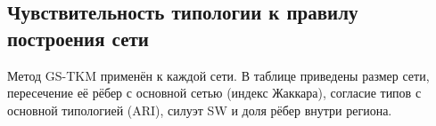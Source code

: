 \documentclass[11pt,a4paper]{article}
\begin{document}
\subsection{Чувствительность типологии к правилу построения сети}\label{ux447ux443ux432ux441ux442ux432ux438ux442ux435ux43bux44cux43dux43eux441ux442ux44c-ux442ux438ux43fux43eux43bux43eux433ux438ux438-ux43a-ux43fux440ux430ux432ux438ux43bux443-ux43fux43eux441ux442ux440ux43eux435ux43dux438ux44f-ux441ux435ux442ux438}

Метод GS-TKM применён к каждой сети. В таблице приведены размер сети, пересечение её рёбер с основной сетью (индекс Жаккара), согласие типов с основной типологией (ARI), силуэт SW и доля рёбер внутри региона.

\begingroup\footnotesize\setlength{\tabcolsep}{4pt}
\end{document}

